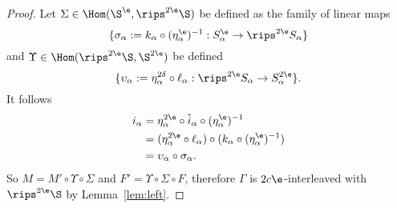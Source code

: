 \begin{proof}
  Let $\Sigma\in\Hom(\S^\e, \rips^{2\e}\S)$ be defined as the family of linear maps
  \[\{\sigma_\alpha := k_\alpha\circ (\eta_\alpha^\e)^{-1} : S_\alpha^\e\to \rips^{2\e} S_\alpha\}\]
  and $\Upsilon\in\Hom(\rips^{2\e}\S, \S^{2\e})$ be defined
  \[\{\upsilon_\alpha := \eta_\alpha^{2\delta}\circ \ell_\alpha : \rips^{2\e} S_\alpha \to S^{2\e}_\alpha\}.\]
  It follows
  \begin{align*}
    i_\alpha &= \eta_\alpha^{2\e}\circ \check{i}_\alpha\circ (\eta_\alpha^\e)^{-1}\\
      &= (\eta_\alpha^{2\e}\circ \ell_\alpha)\circ (k_\alpha\circ (\eta_\alpha^\e)^{-1})\\
      &= \upsilon_\alpha\circ\sigma_\alpha.
  \end{align*}
  So $M = M'\circ\Upsilon\circ \Sigma$ and $F' = \Upsilon\circ\Sigma\circ F$, therefore $\Gamma$ is $2c\e$-interleaved with $\rips^{2\e}\S$ by Lemma~\ref{lem:left}.
\end{proof}

%

